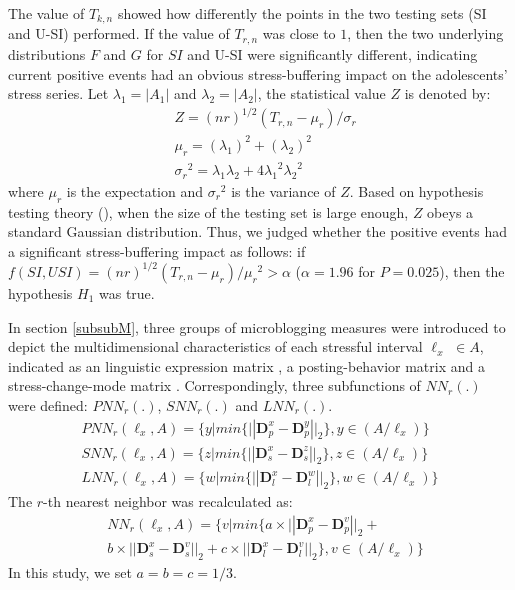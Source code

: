 \documentclass[5p,times,numbers,authoryear]{elsarticle}
\begin{document}
The value of $T_{k,n}$ showed how differently the points in the two testing sets (SI and U-SI) performed.
If the value of $T_{r,n}$ was close to $1$, then the two underlying distributions $F$ and $G$ for $SI$ and U-SI were significantly different, indicating current positive events had an obvious stress-buffering impact on the adolescents' stress series.
Let $\lambda_1=|A_1|$ and $\lambda_2=|A_2|$, the statistical value $Z$ is denoted by:
\begin{align}
&Z=(nr)^{1/2}(T_{r,n}-\mu_{r})/\sigma_{r}\\
&\mu_r=(\lambda_1)^2+(\lambda_2)^2\\
&{\sigma_r}^2=\lambda_1\lambda_2+4{\lambda_1}^2{\lambda_2}^2
\end{align}
where $\mu_r$ is the expectation and ${\sigma_r}^2$ is the variance of $Z$.
Based on hypothesis testing theory (\cite{Johnson2012Applied}), when the size of the testing set is large enough, $Z$ obeys a standard Gaussian distribution.
Thus, we judged whether the positive events had a significant stress-buffering impact as follows:
if $f(SI,USI)=(nr)^{1/2}(T_{r,n}-\mu_{r})/{\mu_r}^2>\alpha$ ($\alpha = 1.96$ for $P=0.025$),
then the hypothesis $H_1$ was true.

In section \ref{subsubM}, three groups of microblogging measures
were introduced to depict the multidimensional characteristics of each stressful interval $\ell_x$ $\in A$, indicated as an linguistic expression matrix , a posting-behavior matrix  and a stress-change-mode matrix .
Correspondingly, three subfunctions of $NN_r(.)$ were defined: $PNN_r(.)$, $SNN_r(.)$ and $LNN_r(.)$.
\begin{equation}
\begin{aligned}
& PNN_r(\ell_x,A)
= \{y | min\{||\textbf{D}_p^x-\textbf{D}_p^y ||_2\}, y\in(A/\ell_x)\} &\\
& SNN_r(\ell_x,A)
= \{z | min\{||\textbf{D}_s^x-\textbf{D}_s^z ||_2\}, z\in(A/\ell_x)\} \\
& LNN_r(\ell_x,A)
= \{w | min\{||\textbf{D}_l^x-\textbf{D}_l^w ||_2\}, w\in(A/\ell_x)\} &
 \end{aligned}
 \end{equation}
The $r$-th nearest neighbor was recalculated as:
\begin{align}
&NN_r(\ell_x,A) = \{v | min\{a \times ||\textbf{D}_p^x-\textbf{D}_p^v||_2+\\
&b \times ||\textbf{D}_s^x-\textbf{D}_s^v||_2+
c \times ||\textbf{D}_l^x-\textbf{D}_l^v||_2\}, v\in(A/\ell_x) \}
\end{align}
In this study, we set $a = b = c = 1/3$.
\end{document}
